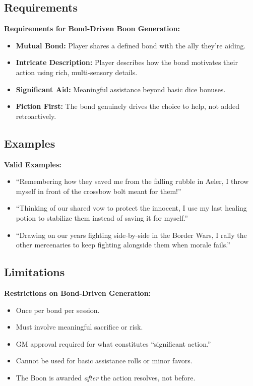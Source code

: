 \subsection{Requirements}
\label{subsec:bond-requirements}

\textbf{Requirements for Bond-Driven Boon Generation:}
\begin{itemize}
    \item \textbf{Mutual Bond:} Player shares a defined bond with the ally they're aiding. 
    \item \textbf{Intricate Description:} Player describes how the bond motivates their action using rich, multi-sensory details. 
    \item \textbf{Significant Aid:} Meaningful assistance beyond basic dice bonuses. 
    \item \textbf{Fiction First:} The bond genuinely drives the choice to help, not added retroactively. 
\end{itemize}

\subsection{Examples}
\label{subsec:bond-examples}

\textbf{Valid Examples:}
\begin{itemize}
    \item ``Remembering how they saved me from the falling rubble in Aeler, I throw myself in front of the crossbow bolt meant for them!''
    \item ``Thinking of our shared vow to protect the innocent, I use my last healing potion to stabilize them instead of saving it for myself.''
    \item ``Drawing on our years fighting side-by-side in the Border Wars, I rally the other mercenaries to keep fighting alongside them when morale fails.''
\end{itemize}

\subsection{Limitations}
\label{subsec:bond-limitations}

\textbf{Restrictions on Bond-Driven Generation:}
\begin{itemize}
    \item Once per bond per session. 
    \item Must involve meaningful sacrifice or risk. 
    \item GM approval required for what constitutes ``significant action.'' 
    \item Cannot be used for basic assistance rolls or minor favors. 
    \item The Boon is awarded \emph{after} the action resolves, not before. 
\end{itemize}

